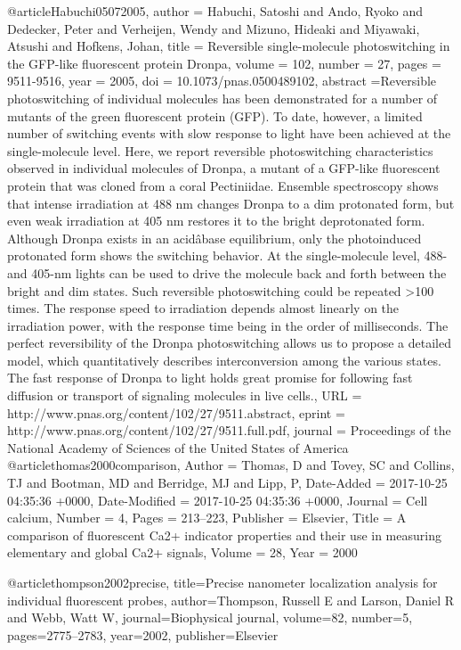 {{{{{{{{{{{@article{Habuchi05072005,
author = {Habuchi, Satoshi and Ando, Ryoko and Dedecker, Peter and Verheijen, Wendy and Mizuno, Hideaki and Miyawaki, Atsushi and Hofkens, Johan}, 
title = {Reversible single-molecule photoswitching in the GFP-like fluorescent protein Dronpa},
volume = {102}, 
number = {27}, 
pages = {9511-9516}, 
year = {2005}, 
doi = {10.1073/pnas.0500489102}, 
abstract ={Reversible photoswitching of individual molecules has been demonstrated for a number of mutants of the green fluorescent protein (GFP). To date, however, a limited number of switching events with slow response to light have been achieved at the single-molecule level. Here, we report reversible photoswitching characteristics observed in individual molecules of Dronpa, a mutant of a GFP-like fluorescent protein that was cloned from a coral Pectiniidae. Ensemble spectroscopy shows that intense irradiation at 488 nm changes Dronpa to a dim protonated form, but even weak irradiation at 405 nm restores it to the bright deprotonated form. Although Dronpa exists in an acidâbase equilibrium, only the photoinduced protonated form shows the switching behavior. At the single-molecule level, 488- and 405-nm lights can be used to drive the molecule back and forth between the bright and dim states. Such reversible photoswitching could be repeated >100 times. The response speed to irradiation depends almost linearly on the irradiation power, with the response time being in the order of milliseconds. The perfect reversibility of the Dronpa photoswitching allows us to propose a detailed model, which quantitatively describes interconversion among the various states. The fast response of Dronpa to light holds great promise for following fast diffusion or transport of signaling molecules in live cells.}, 
URL = {http://www.pnas.org/content/102/27/9511.abstract}, 
eprint = {http://www.pnas.org/content/102/27/9511.full.pdf}, 
journal = {Proceedings of the National Academy of Sciences of the United States of America} 
}
@article{thomas2000comparison,
	Author = {Thomas, D and Tovey, SC and Collins, TJ and Bootman, MD and Berridge, MJ and Lipp, P},
	Date-Added = {2017-10-25 04:35:36 +0000},
	Date-Modified = {2017-10-25 04:35:36 +0000},
	Journal = {Cell calcium},
	Number = {4},
	Pages = {213--223},
	Publisher = {Elsevier},
	Title = {A comparison of fluorescent Ca2+ indicator properties and their use in measuring elementary and global Ca2+ signals},
	Volume = {28},
	Year = {2000}}

@article{thompson2002precise,
  title={Precise nanometer localization analysis for individual fluorescent probes},
  author={Thompson, Russell E and Larson, Daniel R and Webb, Watt W},
  journal={Biophysical journal},
  volume={82},
  number={5},
  pages={2775--2783},
  year={2002},
  publisher={Elsevier}
}

}}}}}}}}}}}
